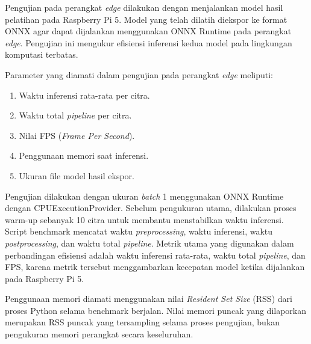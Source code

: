 \begin{sectioncontent}
\begin{subsectioncontent}
    Pengujian pada perangkat \textit{edge} dilakukan dengan menjalankan model hasil pelatihan pada Raspberry Pi 5. Model yang telah dilatih diekspor ke format ONNX agar dapat dijalankan menggunakan ONNX Runtime pada perangkat \textit{edge}. Pengujian ini mengukur efisiensi inferensi kedua model pada lingkungan komputasi terbatas.

        Parameter yang diamati dalam pengujian pada perangkat \textit{edge} meliputi:

        \begin{enumerate}[leftmargin=0.75cm,label=\arabic*.]
            \item Waktu inferensi rata-rata per citra.
            \item Waktu total \textit{pipeline} per citra.
            \item Nilai FPS (\textit{Frame Per Second}).
            \item Penggunaan memori saat inferensi.
            \item Ukuran file model hasil ekspor.
        \end{enumerate}

        Pengujian dilakukan dengan ukuran \textit{batch} 1 menggunakan ONNX Runtime dengan CPUExecutionProvider. Sebelum pengukuran utama, dilakukan proses warm-up sebanyak 10 citra untuk membantu menstabilkan waktu inferensi. Script benchmark mencatat waktu \textit{preprocessing}, waktu inferensi, waktu \textit{postprocessing}, dan waktu total \textit{pipeline}. Metrik utama yang digunakan dalam perbandingan efisiensi adalah waktu inferensi rata-rata, waktu total \textit{pipeline}, dan FPS, karena metrik tersebut menggambarkan kecepatan model ketika dijalankan pada Raspberry Pi 5.

        Penggunaan memori diamati menggunakan nilai \textit{Resident Set Size} (RSS) dari proses Python selama benchmark berjalan. Nilai memori puncak yang dilaporkan merupakan RSS puncak yang tersampling selama proses pengujian, bukan pengukuran memori perangkat secara keseluruhan.
\end{subsectioncontent}
\end{sectioncontent}

